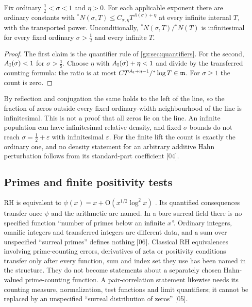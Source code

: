 \documentclass[11pt,a4paper]{article}
\numberwithin{equation}{section}
\theoremstyle{definition}
\theoremstyle{remark}
\newcommand{\mm}{\mathfrak m}
\newcommand{\eps}{\varepsilon}
\newcommand{\src}[1]{\textup{[#1]}}
\newcommand{\bigO}{\mathrm{O}}
\begin{document}
\begin{proposition}[Fixed-parameter density transfer \src{04, 05, 06}]\label{gz:prop:density}
Fix ordinary $\tfrac12<\sigma<1$ and $\eta>0$. For each applicable exponent
there are ordinary constants with ${}^*N(\sigma,T)\le C_{\sigma,\eta}T^{A(\sigma)+\eta}$
at every infinite internal $T$, with the transported power. Unconditionally,
${}^*N(\sigma,T)/{}^*N(T)$ is infinitesimal for every fixed ordinary
$\sigma>\tfrac12$ and every infinite $T$.
\end{proposition}
\begin{proof}
The first claim is the quantifier rule of \cref{gz:sec:quantifiers}. For the
second, $A_{\rm I}(\sigma)<1$ for $\sigma>\tfrac12$. Choose $\eta$ with
$A_{\rm I}(\sigma)+\eta<1$ and divide by the transferred counting formula:
the ratio is at most $CT^{A_{\rm I}+\eta-1}/{}^*\log T\in\mm$. For
$\sigma\ge1$ the count is zero.
\end{proof}
By reflection and conjugation the same holds to the left of the line, so the
fraction of zeros outside every fixed ordinary-width neighbourhood of the line
is infinitesimal. This is not a proof that all zeros lie on the line. An
infinite population can have infinitesimal relative density, and
fixed-$\sigma$ bounds do not reach $\sigma=\tfrac12+\eps$ with infinitesimal
$\eps$. For the finite lift the count is exactly the ordinary one, and no
density statement for an arbitrary additive Hahn perturbation follows from
its standard-part coefficient \src{04}.

\subsection{Primes and finite positivity tests}\label{gz:sec:positivity}
RH is equivalent to $\psi(x)=x+\bigO(x^{1/2}\log^2x)$ \cite{Titch}. Its
quantified consequences transfer once $\psi$ and the arithmetic are named.
In a bare surreal field there is no specified function ``number of primes
below an infinite $x$''. Ordinary integers, omnific integers and transferred
integers are different data, and a sum over unspecified ``surreal primes''
defines nothing \src{06}. Classical RH equivalences involving
prime-counting errors, derivatives of zeta or positivity conditions
transfer only after every function, sum and index set they use has been
named in the structure. They do not become statements about a separately
chosen Hahn-valued prime-counting function. A pair-correlation statement
likewise needs its counting measure, normalization, test functions and
limit quantifiers; it cannot be replaced by an unspecified ``surreal
distribution of zeros'' \src{05}.
\end{document}
